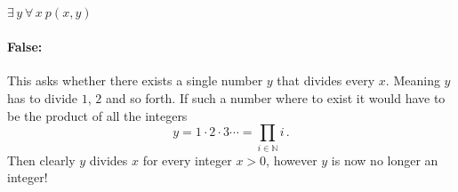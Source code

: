 \documentclass[a4paper, english, 12pt]{article} %
\begin{document}
\begin{subsubproblem}
  $\exists \,y \ \forall \, x \ p(x, y)$
\end{subsubproblem}
\begin{answer}
  \paragraph{False:} This asks whether there exists a single number $y$ that
  divides every $x$. Meaning $y$ has to divide $1$, $2$ and so forth. If such a
  number where to exist it would have to be the product of all the integers 
 \begin{equation*}
   y = 1 \cdot 2 \cdot 3 \cdots = \prod_{i \in \mathbb{N}} i\,.
 \end{equation*}
 Then clearly $y$ divides $x$ for every integer $x > 0$, however $y$ is now no longer
 an integer!
\end{answer} 
\end{document}
